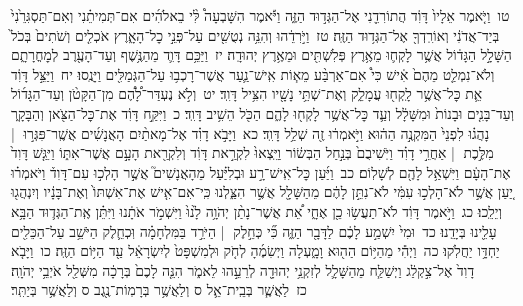\documentclass[18pt]{article}
\newcommand{\vart}[1]{\Bfootnote{#1}}	%
\begin{document}
 {\loc טו~}וַיֹּ֤אמֶר אֵלָיו֙ דָּוִ֔ד הֲתוֹרִדֵ֖נִי אֶל־הַגְּד֣וּד הַזֶּ֑ה וַיֹּ֡אמֶר הִשָּׁבְעָה֩ לִּ֨י בֵאלֹהִ֜ים אִם־תְּמִיתֵ֗נִי וְאִם־תַּסְגִּרֵ֙נִי֙ בְּיַד־אֲדֹנִ֔י וְאוֹרִֽדְךָ֖ אֶל־הַגְּד֥וּד הַזֶּֽה׃ \startlock
 {\loc טז~}וַיֹּ֣רִדֵ֔הוּ וְהִנֵּ֥ה נְטֻשִׁ֖ים עַל־פְּנֵ֣י כׇל־הָאָ֑רֶץ אֹכְלִ֤ים וְשֹׁתִים֙  \edtext{וְחֹ֣גְגִ֔ים}{\vart{א=וְחֹ֣גֲגִ֔ים | }}  בְּכֹל֙ הַשָּׁלָ֣ל הַגָּד֔וֹל אֲשֶׁ֥ר לָקְח֛וּ מֵאֶ֥רֶץ פְּלִשְׁתִּ֖ים וּמֵאֶ֥רֶץ יְהוּדָֽה׃ \startlock
 {\loc יז~}וַיַּכֵּ֥ם דָּוִ֛ד מֵהַנֶּ֥שֶׁף וְעַד־הָעֶ֖רֶב  לְמׇחֳרָתָ֑ם  וְלֹא־נִמְלַ֤ט מֵהֶם֙ אִ֔ישׁ כִּי֩ אִם־אַרְבַּ֨ע מֵא֧וֹת אִֽישׁ־נַ֛עַר אֲשֶׁר־רָכְב֥וּ עַל־הַגְּמַלִּ֖ים וַיָּנֻֽסוּ׃ \startlock
 {\loc יח~}וַיַּצֵּ֣ל דָּוִ֔ד אֵ֛ת כׇּל־אֲשֶׁ֥ר לָֽקְח֖וּ עֲמָלֵ֑ק וְאֶת־שְׁתֵּ֥י נָשָׁ֖יו הִצִּ֥יל דָּוִֽד׃ \startlock
 {\loc יט~}וְלֹ֣א נֶעְדַּר־לָ֠הֶ֠ם מִן־הַקָּטֹ֨ן וְעַד־הַגָּד֜וֹל וְעַד־בָּנִ֤ים וּבָנוֹת֙ וּמִשָּׁלָ֔ל וְעַ֛ד כׇּל־אֲשֶׁ֥ר לָקְח֖וּ לָהֶ֑ם הַכֹּ֖ל הֵשִׁ֥יב דָּוִֽד׃ \startlock
 {\loc כ~}וַיִּקַּ֣ח דָּוִ֔ד אֶת־כׇּל־הַצֹּ֖אן וְהַבָּקָ֑ר נָהֲג֗וּ לִפְנֵי֙ הַמִּקְנֶ֣ה הַה֔וּא וַיֹּ֣אמְר֔וּ זֶ֖ה שְׁלַ֥ל דָּוִֽד׃ \startlock
 {\loc כא~}וַיָּבֹ֣א דָוִ֗ד אֶל־מָאתַ֨יִם הָאֲנָשִׁ֜ים אֲשֶֽׁר־פִּגְּר֣וּ  |  מִלֶּ֣כֶת  |  אַחֲרֵ֣י דָוִ֗ד וַיֹּֽשִׁיבֻם֙ בְּנַ֣חַל הַבְּשׂ֔וֹר וַיֵּֽצְאוּ֙ לִקְרַ֣את דָּוִ֔ד וְלִקְרַ֖את הָעָ֣ם אֲשֶׁר־אִתּ֑וֹ וַיִּגַּ֤שׁ דָּוִד֙ אֶת־הָעָ֔ם וַיִּשְׁאַ֥ל לָהֶ֖ם לְשָׁלֽוֹם׃ \startlock
 {\loc כב~}וַיַּ֜עַן כׇּל־אִֽישׁ־רָ֣ע וּבְלִיַּ֗עַל מֵהָאֲנָשִׁים֮ אֲשֶׁ֣ר הָלְכ֣וּ עִם־דָּוִד֒ וַיֹּאמְר֗וּ יַ֚עַן אֲשֶׁ֣ר לֹא־הָלְכ֣וּ עִמִּ֔י לֹא־נִתֵּ֣ן לָהֶ֔ם מֵהַשָּׁלָ֖ל אֲשֶׁ֣ר הִצַּ֑לְנוּ כִּֽי־אִם־אִ֤ישׁ אֶת־אִשְׁתּוֹ֙ וְאֶת־בָּנָ֔יו וְיִנְהֲג֖וּ וְיֵלֵֽכוּ׃ \startlock
 {\loc כג~}וַיֹּ֣אמֶר דָּוִ֔ד לֹא־תַעֲשׂ֥וּ כֵ֖ן אֶחָ֑י אֵ֠ת אֲשֶׁר־נָתַ֨ן יְהֹוָ֥ה לָ֙נוּ֙ וַיִּשְׁמֹ֣ר אֹתָ֔נוּ וַיִּתֵּ֗ן אֶֽת־הַגְּד֛וּד הַבָּ֥א עָלֵ֖ינוּ בְּיָדֵֽנוּ׃ \startlock
 {\loc כד~}וּמִי֙ יִשְׁמַ֣ע לָכֶ֔ם לַדָּבָ֖ר הַזֶּ֑ה כִּ֞י כְּחֵ֣לֶק  |  הַיֹּרֵ֣ד בַּמִּלְחָמָ֗ה וּֽכְחֵ֛לֶק הַיֹּשֵׁ֥ב עַל־הַכֵּלִ֖ים יַחְדָּ֥ו יַחֲלֹֽקוּ׃ \startlock
 {\loc כה~}וַיְהִ֕י מֵהַיּ֥וֹם הַה֖וּא וָמָ֑עְלָה וַיְשִׂמֶ֜הָ לְחֹ֤ק וּלְמִשְׁפָּט֙ לְיִשְׂרָאֵ֔ל עַ֖ד הַיּ֥וֹם הַזֶּֽה׃ \startlock
 {\loc כו~}וַיָּבֹ֤א דָוִד֙ אֶל־צִ֣קְלַ֔ג וַיְשַׁלַּ֧ח מֵהַשָּׁלָ֛ל לְזִקְנֵ֥י יְהוּדָ֖ה לְרֵעֵ֣הוּ לֵאמֹ֑ר הִנֵּ֤ה לָכֶם֙ בְּרָכָ֔ה מִשְּׁלַ֖ל אֹיְבֵ֥י יְהֹוָֽה׃ \startlock
 {\loc כז~}לַאֲשֶׁ֧ר בְּבֵֽית־אֵ֛ל {ס}     וְלַאֲשֶׁ֥ר בְּרָמֽוֹת־נֶ֖גֶב {ס}     וְלַאֲשֶׁ֥ר בְּיַתִּֽר׃ \startlock
\end{document}
